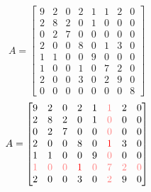 \documentclass[xcolor=x11names,compress]{beamer}
\begin{document}
\begin{frame}
	\begin{columns}
		\begin{overprint}
			\[ A =
				\begin{bmatrix}
					9 & 2 & 0 & 2 & 1 & 1 & 2 & 0 \\
					2 & 8 & 2 & 0 & 1 & 0 & 0 & 0 \\
					0 & 2 & 7 & 0 & 0 & 0 & 0 & 0 \\
					2 & 0 & 0 & 8 & 0 & 1 & 3 & 0 \\
					1 & 1 & 0 & 0 & 9 & 0 & 0 & 0 \\
					1 & 0 & 0 & 1 & 0 & 7 & 2 & 0 \\
					2 & 0 & 0 & 3 & 0 & 2 & 9 & 0 \\
					0 & 0 & 0 & 0 & 0 & 0 & 0 & 8
				\end{bmatrix}
			\]
			\onslide<2>\[ A =
				\begin{bmatrix}
					9                     & 2                     & 0                     & 2                  & 1                     & \textcolor{red!50}{1} & 2                     & 0                     \\
					2                     & 8                     & 2                     & 0                  & 1                     & \textcolor{red!50}{0} & 0                     & 0                     \\
					0                     & 2                     & 7                     & 0                  & 0                     & \textcolor{red!50}{0} & 0                     & 0                     \\
					2                     & 0                     & 0                     & 8                  & 0                     & \textcolor{red}{1}    & 3                     & 0                     \\
					1                     & 1                     & 0                     & 0                  & 9                     & \textcolor{red!50}{0} & 0                     & 0                     \\
					\textcolor{red!50}{1} & \textcolor{red!50}{0} & \textcolor{red!50}{0} & \textcolor{red}{1} & \textcolor{red!50}{0} & \textcolor{red!50}{7} & \textcolor{red!50}{2} & \textcolor{red!50}{0} \\
					2                     & 0                     & 0                     & 3                  & 0                     & \textcolor{red!50}{2} & 9                     & 0                     \\

\end{bmatrix}\]
\end{overprint}
\end{columns}
\end{frame}
\end{document}
